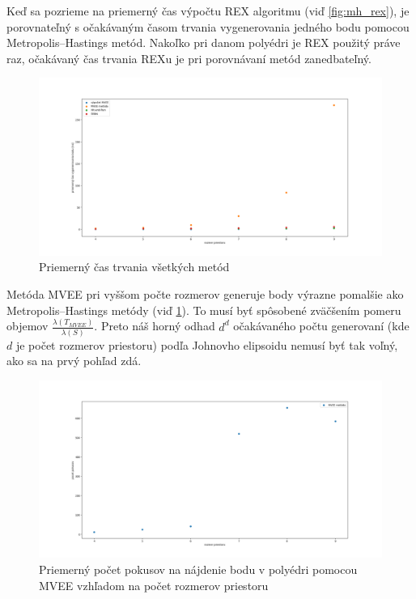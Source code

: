 Keď sa pozrieme na priemerný čas výpočtu REX algoritmu (viď \ref{fig:mh_rex}), je porovnateľný s očakávaným časom trvania vygenerovania jedného bodu pomocou Metropolis--Hastings metód. Nakoľko pri danom polyédri je REX použitý práve raz, očakávaný čas trvania REXu je pri porovnávaní metód zanedbateľný.\\

\begin{figure} [H]
  \includegraphics[width=\linewidth]{images/vsetky.png}
  \caption{Priemerný čas trvania všetkých metód}
  \label{fig:vsetky}
\end{figure}

Metóda MVEE pri vyššom počte rozmerov generuje body výrazne pomalšie ako Metropolis--Hastings metódy (viď \ref{fig:vsetky}).
To musí byť spôsobené zväčšením pomeru objemov $\frac{\lambda(T_{MVEE})}{\lambda(S)}$. Preto náš horný odhad $d^d$ očakávaného počtu generovaní (kde $d$ je počet rozmerov priestoru) podľa Johnovho elipsoidu nemusí byť tak voľný, ako sa na prvý pohľad zdá.\\

\begin{figure} [H]
	\includegraphics[width=\linewidth]{images/mvee_pokusy.png}
	\caption{Priemerný počet pokusov na nájdenie bodu v polyédri pomocou MVEE vzhľadom na počet rozmerov priestoru}
	\label{fig:mvee_pokusy}
\end{figure}

